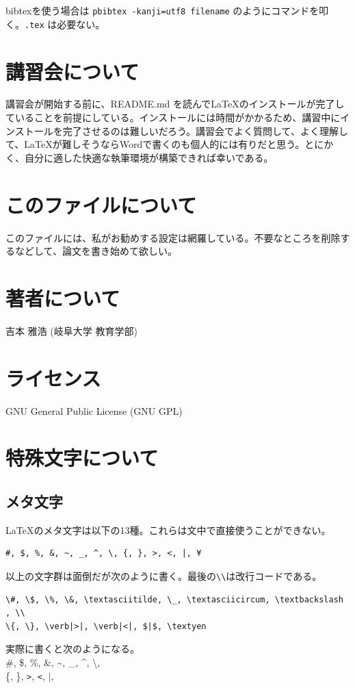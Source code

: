 \documentclass[a4j]{jsarticle}
\begin{document}
bibtexを使う場合は \verb|pbibtex -kanji=utf8 filename| のようにコマンドを叩く。\verb|.tex| は必要ない。

\section*{講習会について}

講習会が開始する前に、README.md を読んで\LaTeX のインストールが完了していることを前提にしている。インストールには時間がかかるため、講習中にインストールを完了させるのは難しいだろう。講習会でよく質問して、よく理解して、LaTeXが難しそうならWordで書くのも個人的には有りだと思う。とにかく、自分に適した快適な執筆環境が構築できれば幸いである。

\section*{このファイルについて}
このファイルには、私がお勧めする設定は網羅している。不要なところを削除するなどして、論文を書き始めて欲しい。

\section*{著者について}

吉本 雅浩 (岐阜大学 教育学部)

\section*{ライセンス}

GNU General Public License (GNU GPL)

\newpage %
\section{特殊文字について}
\subsection{メタ文字}
\LaTeX のメタ文字は以下の13種。これらは文中で直接使うことができない。
\begin{verbatim}
#, $, %, &, ~, _, ^, \, {, }, >, <, |, ¥
\end{verbatim}
以上の文字群は面倒だが次のように書く。最後の\verb|\\|は改行コードである。
\begin{verbatim}
\#, \$, \%, \&, \textasciitilde, \_, \textasciicircum, \textbackslash , \\
\{, \}, \verb|>|, \verb|<|, $|$, \textyen
\end{verbatim}
実際に書くと次のようになる。\\
\#, \$, \%, \&, \textasciitilde, \_, \textasciicircum, \textbackslash , \\
\{, \}, \verb|>|, \verb|<|, $|$, \textyen
\end{document}
